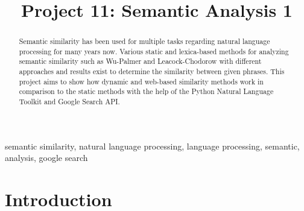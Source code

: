 \documentclass[conference]{IEEEtran}
\begin{document}
\title{Project 11: Semantic Analysis 1}

\author{
\and
{}
}

\maketitle
\begin{abstract}
Semantic similarity has been used for multiple tasks regarding natural language processing for many years now. Various static and lexica-based methods for analyzing semantic similarity such as Wu-Palmer and Leacock-Chodorow with different approaches and results exist to determine the similarity between given phrases. This project aims to show how dynamic and web-based similarity methods work in comparison to the static methods with the help of the Python Natural Language Toolkit and Google Search API.
\end{abstract}

\begin{IEEEkeywords}
semantic similarity, natural language processing, language processing, semantic, analysis, google search
\end{IEEEkeywords}

\section{Introduction}
\end{document}
